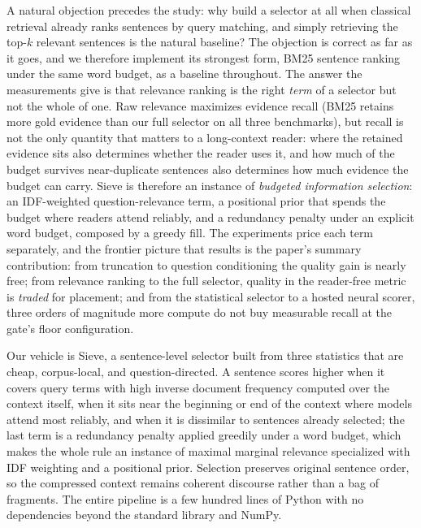 \documentclass[preprint,12pt]{elsarticle}
\theoremstyle{remark}
\newcommand{\method}{Sieve}
\begin{document}
A natural objection precedes the study: why build a selector at all
when classical retrieval already ranks sentences by query matching,
and simply retrieving the top-$k$ relevant sentences is the natural
baseline? The objection
is correct as far as it goes, and we therefore implement its strongest
form, BM25 sentence ranking under the same word budget, as a baseline
throughout. The answer the measurements give is that relevance ranking
is the right \emph{term} of a selector but not the whole of one.
Raw relevance maximizes evidence recall (BM25 retains more gold
evidence than our full selector on all three benchmarks), but recall
is not the only quantity that matters to a long-context reader: where
the retained evidence sits also determines whether the reader uses it,
and how much of the budget survives near-duplicate sentences also
determines how much evidence the budget can carry. \method{} is
therefore an instance of \emph{budgeted information selection}: an
IDF-weighted question-relevance term, a positional prior that spends
the budget where readers attend reliably, and a redundancy penalty
under an explicit word budget, composed by a greedy fill. The
experiments price each term separately, and the frontier picture that
results is the paper's summary contribution: from truncation to
question conditioning the quality gain is nearly free; from relevance
ranking to the full selector, quality in the reader-free metric is
\emph{traded} for placement; and from the statistical selector to a
hosted neural scorer, three orders of magnitude more compute do not
buy measurable recall at the gate's floor configuration.

Our vehicle is \method{}, a sentence-level selector built from three
statistics that are cheap, corpus-local, and question-directed. A
sentence scores higher when it covers query terms with high inverse
document frequency computed over the context itself, when it sits near
the beginning or end of the context where models attend most reliably,
and when it is dissimilar to sentences already selected; the last term
is a redundancy penalty applied greedily under a word budget, which
makes the whole rule an instance of maximal marginal relevance
\citep{carbonell1998mmr} specialized with IDF weighting
\citep{robertson2009bm25} and a positional prior. Selection preserves
original sentence order, so the compressed context remains coherent
discourse rather than a bag of fragments. The entire pipeline is a few
hundred lines of Python with no dependencies beyond the standard
library and NumPy.
\end{document}
